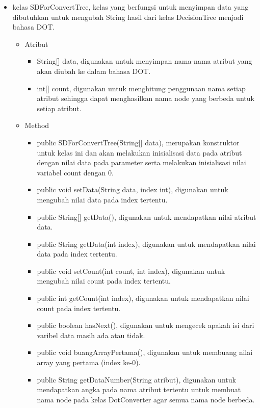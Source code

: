 \begin{itemize}
	\item kelas SDForConvertTree, kelas yang berfungsi untuk menyimpan data yang dibutuhkan untuk mengubah String hasil dari kelas DecisionTree menjadi bahasa DOT.
	\begin{itemize}
		\item Atribut
		\begin{itemize}
			\item String[] data, digunakan untuk menyimpan nama-nama atribut yang akan diubah ke dalam bahasa DOT.
			\item int[] count, digunakan untuk menghitung penggunaan nama setiap atribut sehingga dapat menghasilkan nama node yang berbeda untuk setiap atribut.
		\end{itemize}
		\item Method
		\begin{itemize}
			\item public SDForConvertTree(String[] data), merupakan konstruktor untuk kelas ini dan akan melakukan inisialisasi data pada atribut dengan nilai data pada parameter serta melakukan inisialisasi nilai variabel count dengan 0.
			\item public void setData(String data, index int), digunakan untuk mengubah nilai data pada index tertentu.
			\item public String[] getData(), digunakan untuk mendapatkan nilai atribut data.
			\item public String getData(int index), digunakan untuk mendapatkan nilai data pada index tertentu.
			\item public void setCount(int count, int index), digunakan untuk mengubah nilai count pada index tertentu.
			\item public int getCount(int index), digunakan untuk mendapatkan nilai count pada index tertentu.
			\item public boolean hasNext(), digunakan untuk mengecek apakah isi dari varibel data masih ada atau tidak.
			\item public void buangArrayPertama(), digunakan untuk membuang nilai array yang pertama (index ke-0).
			\item public String getDataNumber(String atribut), digunakan untuk mendapatkan angka pada nama atribut tertentu untuk membuat nama node pada kelas DotConverter agar semua nama node berbeda.
		\end{itemize}
	\end{itemize}
\end{itemize}

